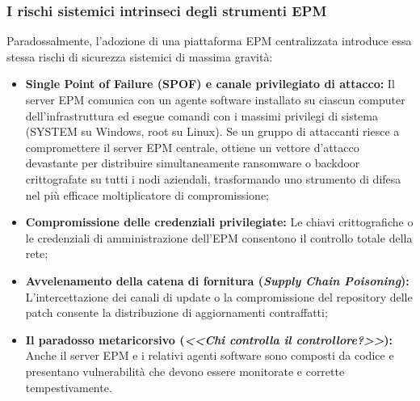 \documentclass[../../main.tex]{subfiles}
\begin{document}
\subsubsection{I rischi sistemici intrinseci degli strumenti EPM}
Paradossalmente, l'adozione di una piattaforma EPM centralizzata introduce essa stessa rischi di sicurezza sistemici di massima gravità:
\begin{itemize}
    \item \textbf{Single Point of Failure (SPOF) e canale privilegiato di attacco:} Il server EPM comunica con un agente software installato su ciascun computer dell'infrastruttura ed esegue comandi con i massimi privilegi di sistema (SYSTEM su Windows, root su Linux). Se un gruppo di attaccanti riesce a compromettere il server EPM centrale, ottiene un vettore d'attacco devastante per distribuire simultaneamente ransomware o backdoor crittografate su tutti i nodi aziendali, trasformando uno strumento di difesa nel più efficace moltiplicatore di compromissione;
    \item \textbf{Compromissione delle credenziali privilegiate:} Le chiavi crittografiche o le credenziali di amministrazione dell'EPM consentono il controllo totale della rete;
    \item \textbf{Avvelenamento della catena di fornitura (\textit{Supply Chain Poisoning}):} L'intercettazione dei canali di update o la compromissione del repository delle patch consente la distribuzione di aggiornamenti contraffatti;
    \item \textbf{Il paradosso metaricorsivo (\textit{<<Chi controlla il controllore?>>}):} Anche il server EPM e i relativi agenti software sono composti da codice e presentano vulnerabilità che devono essere monitorate e corrette tempestivamente.
\end{itemize}
\end{document}
